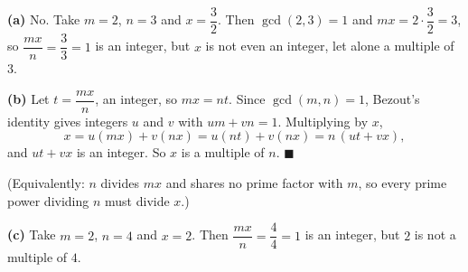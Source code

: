 \textbf{(a)} No. Take $m=2$, $n=3$ and $x=\dfrac{3}{2}$. Then $\gcd(2,3)=1$ and $mx=2\cdot\dfrac{3}{2}=3$, so $\dfrac{mx}{n}=\dfrac{3}{3}=1$ is an integer, but $x$ is not even an integer, let alone a multiple of $3$.

\textbf{(b)} Let $t=\dfrac{mx}{n}$, an integer, so $mx=nt$. Since $\gcd(m,n)=1$, Bezout's identity gives integers $u$ and $v$ with $um+vn=1$. Multiplying by $x$,
\[x=u(mx)+v(nx)=u(nt)+v(nx)=n\,(ut+vx),\]
and $ut+vx$ is an integer. So $x$ is a multiple of $n$. $\blacksquare$

(Equivalently: $n$ divides $mx$ and shares no prime factor with $m$, so every prime power dividing $n$ must divide $x$.)

\textbf{(c)} Take $m=2$, $n=4$ and $x=2$. Then $\dfrac{mx}{n}=\dfrac{4}{4}=1$ is an integer, but $2$ is not a multiple of $4$.
